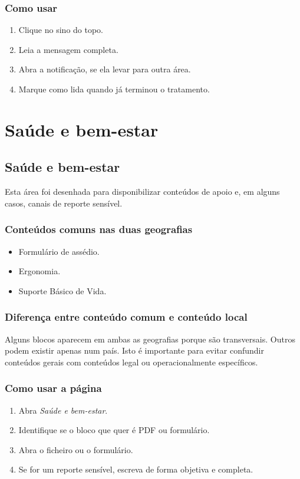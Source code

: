 \subsection{Como usar}
\begin{enumerate}
  \item Clique no sino do topo.
  \item Leia a mensagem completa.
  \item Abra a notificação, se ela levar para outra área.
  \item Marque como lida quando já terminou o tratamento.
\end{enumerate}

\chapter{Saúde e bem-estar}
\section{Saúde e bem-estar}
Esta área foi desenhada para disponibilizar conteúdos de apoio e, em alguns casos, canais de reporte sensível.

\subsection{Conteúdos comuns nas duas geografias}
\begin{itemize}
  \item Formulário de assédio.
  \item Ergonomia.
  \item Suporte Básico de Vida.
\end{itemize}

\subsection{Diferença entre conteúdo comum e conteúdo local}
Alguns blocos aparecem em ambas as geografias porque são transversais. Outros podem existir apenas num país. Isto é importante para evitar confundir conteúdos gerais com conteúdos legal ou operacionalmente específicos.

\subsection{Como usar a página}
\begin{enumerate}
  \item Abra \textit{Saúde e bem-estar}.
  \item Identifique se o bloco que quer é PDF ou formulário.
  \item Abra o ficheiro ou o formulário.
  \item Se for um reporte sensível, escreva de forma objetiva e completa.
\end{enumerate}

